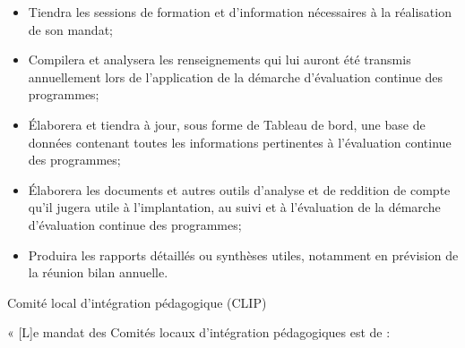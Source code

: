 \documentclass [12 pt]{article}
\begin{document}
        \begin{itemize}
        
                
        \item Tiendra les sessions de formation et d'information nécessaires à la réalisation
                    de son mandat;
                
        \item Compilera et analysera les renseignements qui lui auront été transmis
                    annuellement lors de l'application de la démarche d'évaluation continue des
                    programmes;
                
        \item Élaborera et tiendra à jour, sous forme de Tableau de bord, une base de données
                    contenant toutes les informations pertinentes à l'évaluation continue des
                    programmes;
                
        \item Élaborera les documents et autres outils d'analyse et de reddition de compte
                    qu'il jugera utile à l'implantation, au suivi et à l'évaluation de la démarche
                    d'évaluation continue des programmes;
                
        \item Produira les rapports détaillés ou synthèses utiles, notamment en prévision de
                    la réunion bilan annuelle.
            
        \end{itemize}
    
            Comité local d'intégration pédagogique (CLIP)
            
                « [L]e mandat des Comités locaux d'intégration pédagogiques est de :
                
\end{document}
